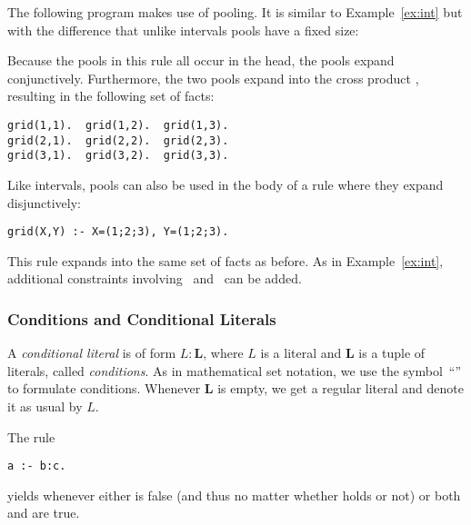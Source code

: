 \begin{example}\label{ex:pool}
The following program makes use of pooling. 
It is similar to Example~\ref{ex:int}
but with the difference that unlike intervals pools have a fixed size:%

%
Because the pools in this rule all occur in the head,
the pools expand conjunctively.
Furthermore, the two pools expand into the cross product ,
resulting in the following set of facts:
\begin{lstlisting}[numbers=none]
grid(1,1).  grid(1,2).  grid(1,3).
grid(2,1).  grid(2,2).  grid(2,3).
grid(3,1).  grid(3,2).  grid(3,3).
\end{lstlisting}
Like intervals, pools can also be used in the body of a rule where they expand disjunctively:
\begin{lstlisting}
grid(X,Y) :- X=(1;2;3), Y=(1;2;3).
\end{lstlisting}
This rule expands into the same set of facts as before.
As in Example~\ref{ex:int}, additional constraints involving~ and~ can be added.
\eexample
\end{example}

\subsubsection{Conditions and Conditional Literals}\label{subsec:gringo:condition}
%
%
A \emph{conditional literal} is of form $L:\boldsymbol{L}$,
where $L$ is a literal and $\boldsymbol{L}$ is a tuple of literals, called \textit{conditions}.
As in mathematical set notation,
we use the symbol~``\code{:}'' to formulate conditions.
Whenever $\boldsymbol{L}$ is empty, we get a regular literal and denote it as usual by $L$.

\begin{example}
The rule
\begin{lstlisting}[numbers=none]
a :- b:c.
\end{lstlisting}
yields  whenever either  is false (and thus no matter whether  holds or not) or both  and  are true.
\end{example}

